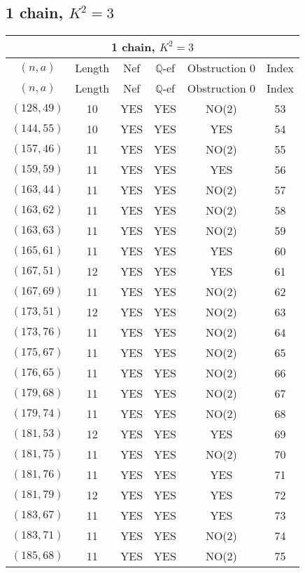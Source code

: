 \subsection{1 chain, \(K^2 = 3\)}
\begin{longtable}{|c|c|c|c|c|c|}
\hline
\multicolumn{6}{|c|}{1 chain, $K^2 = 3$}\\
\hline
$(n,a)$ & Length & Nef & $\mathbb Q$-ef & Obstruction 0 & Index\\
\hline
\endfirsthead

\hline
$(n,a)$ & Length & Nef & $\mathbb Q$-ef & Obstruction 0 & Index\\
\hline
\endhead
\hline
\endfoot

$(128, 49)$ & 10 & YES & YES & NO(2) & 53\\
$(144, 55)$ & 10 & YES & YES & YES & 54\\
$(157, 46)$ & 11 & YES & YES & NO(2) & 55\\
$(159, 59)$ & 11 & YES & YES & YES & 56\\
$(163, 44)$ & 11 & YES & YES & NO(2) & 57\\
$(163, 62)$ & 11 & YES & YES & NO(2) & 58\\
$(163, 63)$ & 11 & YES & YES & NO(2) & 59\\
$(165, 61)$ & 11 & YES & YES & YES & 60\\
$(167, 51)$ & 12 & YES & YES & YES & 61\\
$(167, 69)$ & 11 & YES & YES & NO(2) & 62\\
$(173, 51)$ & 12 & YES & YES & NO(2) & 63\\
$(173, 76)$ & 11 & YES & YES & NO(2) & 64\\
$(175, 67)$ & 11 & YES & YES & NO(2) & 65\\
$(176, 65)$ & 11 & YES & YES & NO(2) & 66\\
$(179, 68)$ & 11 & YES & YES & NO(2) & 67\\
$(179, 74)$ & 11 & YES & YES & NO(2) & 68\\
$(181, 53)$ & 12 & YES & YES & YES & 69\\
$(181, 75)$ & 11 & YES & YES & NO(2) & 70\\
$(181, 76)$ & 11 & YES & YES & YES & 71\\
$(181, 79)$ & 12 & YES & YES & YES & 72\\
$(183, 67)$ & 11 & YES & YES & YES & 73\\
$(183, 71)$ & 11 & YES & YES & NO(2) & 74\\
$(185, 68)$ & 11 & YES & YES & NO(2) & 75\\

\end{longtable}
